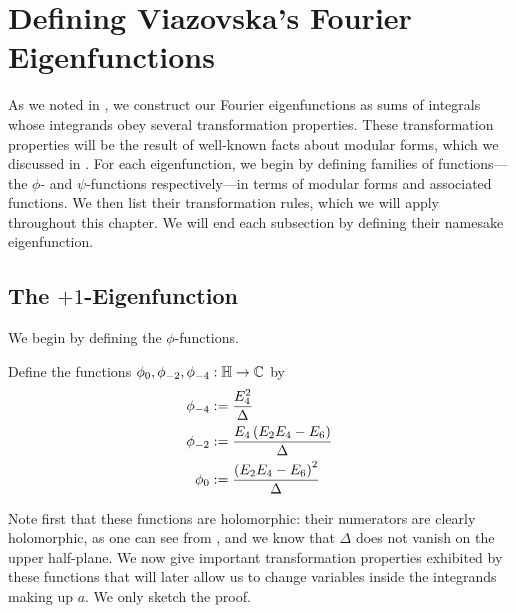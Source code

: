 \section{Defining Viazovska's Fourier Eigenfunctions}
\label{Ch4:Sec:Defs}

As we noted in , we construct our Fourier eigenfunctions as sums of integrals whose integrands obey several transformation properties. These transformation properties will be the result of well-known facts about modular forms, which we discussed in . For each eigenfunction, we begin by defining families of functions---the $\phi$- and $\psi$-functions respectively---in terms of modular forms and associated functions. We then list their transformation rules, which we will apply throughout this chapter. We will end each subsection by defining their namesake eigenfunction.

\subsection{The $+1$-Eigenfunction}

We begin by defining the $\phi$-functions.

\begin{boxdefinition}\label{Ch4:Def:phis}
    Define the functions $\phi_0, \phi_{-2}, \phi_{-4} : \mathbb{H} \to \mathbb{C}$ by
    \begin{align}
        \phi_{-4} &:= \frac{E_4^2}{\Delta}
            \label{Ch4:Eq:phi_-4_def} \\
        \phi_{-2} &:= \frac{E_4\left( E_2 E_4 - E_6 \right)}{\Delta}
            \label{Ch4:Eq:phi_-2_def} \\
        \phi_{0} &:= \frac{\left( E_2 E_4 - E_6 \right)^2}{\Delta}
            \label{Ch4:Eq:phi_0_def}
    \end{align}
\end{boxdefinition}

Note first that these functions are holomorphic: their numerators are clearly holomorphic, as one can see from , and we know that $\Delta$ does not vanish on the upper half-plane. We now give important transformation properties exhibited by these functions that will later allow us to change variables inside the integrands making up $a$. We only sketch the proof.


